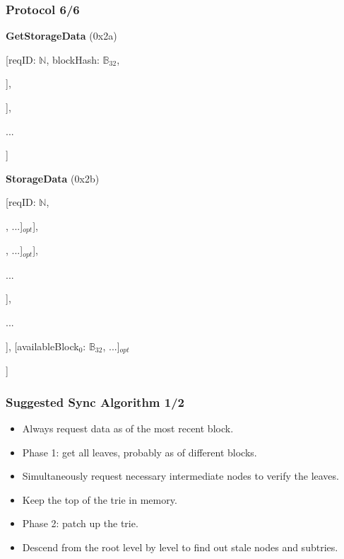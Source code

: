 \documentclass{beamer}
\begin{document}
\begin{frame}
  \frametitle{Protocol 6/6}

  \textbf{GetStorageData} (0x2a)

  [reqID: $\mathbb{N}$, blockHash: $\mathbb{B}_{32}$,
  
  \quad [accountAddress$^0$: $\mathbb{B}_{20}$, [prefix$^0_0$: $\mathbb{Y}$, prefix$^0_1$: $\mathbb{Y}$, ...]],
  
  \quad [accountAddress$^1$: $\mathbb{B}_{20}$, [prefix$^1_0$: $\mathbb{Y}$, prefix$^1_1$: $\mathbb{Y}$, ...]],
  
  \quad ...
  
  ]
  \bigskip

  \textbf{StorageData} (0x2b)
  \nopagebreak
  
  [reqID: $\mathbb{N}$,
  
  \quad [
  
  \qquad [
  
  \quad \qquad [status$^0_0$: $\mathbb{N}$, [[key$^0_{00}$: $\mathbb{B}_{32}$, val$^0_{00}$: $\mathbb{B}$], ...]$_{opt}$],
  
  \quad \qquad [status$^0_1$: $\mathbb{N}$, [[key$^0_{10}$: $\mathbb{B}_{32}$, val$^0_{10}$: $\mathbb{B}$], ...]$_{opt}$],
  
  \quad \qquad ...
  
  \qquad ],
  
  \qquad ...
  
  \quad ], [availableBlock$_0$: $\mathbb{B}_{32}$, ...]$_{opt}$
  
  ]

\end{frame}

\begin{frame}
  \frametitle{Suggested Sync Algorithm 1/2}

  \begin{itemize}
    \item Always request data as of the most recent block.
    \item Phase 1: get all leaves, probably as of different blocks.
    \item Simultaneously request necessary intermediate nodes to verify the leaves.
    \item Keep the top of the trie in memory.
    \item Phase 2: patch up the trie.
    \item Descend from the root level by level to find out stale nodes and subtries. 
  \end{itemize}

\end{frame}
\end{document}
